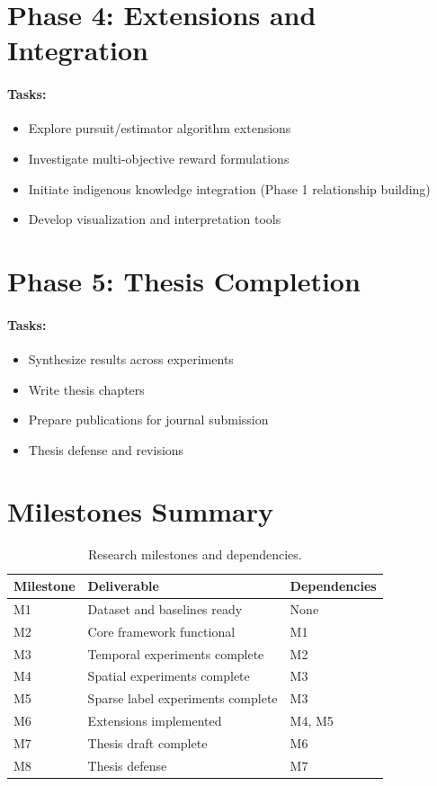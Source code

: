 \documentclass[12pt,oneside]{book}
\begin{document}
\section{Phase 4: Extensions and Integration}

\paragraph{Tasks:}
\begin{itemize}
    \item Explore pursuit/estimator algorithm extensions
    \item Investigate multi-objective reward formulations
    \item Initiate indigenous knowledge integration (Phase 1 relationship building)
    \item Develop visualization and interpretation tools
\end{itemize}

\section{Phase 5: Thesis Completion}

\paragraph{Tasks:}
\begin{itemize}
    \item Synthesize results across experiments
    \item Write thesis chapters
    \item Prepare publications for journal submission
    \item Thesis defense and revisions
\end{itemize}

\section{Milestones Summary}

\begin{table}[H]
\centering
\footnotesize
\begin{tabular}{lll}
\toprule
\textbf{Milestone} & \textbf{Deliverable} & \textbf{Dependencies} \\
\midrule
M1 & Dataset and baselines ready & None \\
M2 & Core framework functional & M1 \\
M3 & Temporal experiments complete & M2 \\
M4 & Spatial experiments complete & M3 \\
M5 & Sparse label experiments complete & M3 \\
M6 & Extensions implemented & M4, M5 \\
M7 & Thesis draft complete & M6 \\
M8 & Thesis defense & M7 \\
\bottomrule
\end{tabular}
\caption{Research milestones and dependencies.}
\label{tab:milestones}
\end{table}




\end{document}
